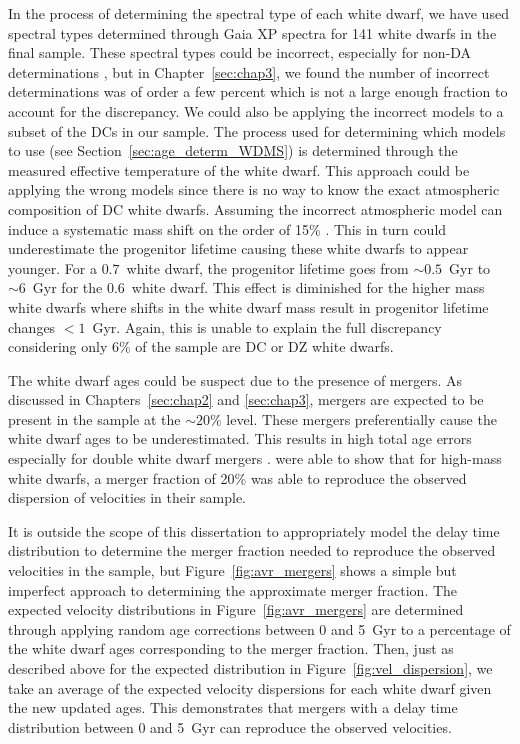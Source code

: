 In the process of determining the spectral type of each white dwarf, we have used spectral types determined through Gaia XP spectra for 141 white dwarfs in the final sample. These spectral types could be incorrect, especially for non-DA determinations \citep{2024ANA...682A...5V}, but in Chapter~\ref{sec:chap3}, we found the number of incorrect determinations was of order a few percent which is not a large enough fraction to account for the discrepancy. We could also be applying the incorrect models to a subset of the DCs in our sample. The process used for determining which models to use (see Section~\ref{sec:age_determ_WDMS}) is determined through the measured effective temperature of the white dwarf. This approach could be applying the wrong models since there is no way to know the exact atmospheric composition of DC white dwarfs. Assuming the incorrect atmospheric model can induce a systematic mass shift on the order of 15\% \citep{2012ApJS..199...29G}. This in turn could underestimate the progenitor lifetime causing these white dwarfs to appear younger. For a $0.7$\msun\ white dwarf, the progenitor lifetime goes from $\sim0.5$~Gyr to $\sim6$~Gyr for the $0.6$\msun\ white dwarf. This effect is diminished for the higher mass white dwarfs where shifts in the white dwarf mass result in progenitor lifetime changes $<1$~Gyr. Again, this is unable to explain the full discrepancy considering only 6\% of the sample are DC or DZ white dwarfs.

The white dwarf ages could be suspect due to the presence of mergers. As discussed in Chapters~\ref{sec:chap2} and \ref{sec:chap3}, mergers are expected to be present in the sample at the $\sim20\%$ level. These mergers preferentially cause the white dwarf ages to be underestimated. This results in high total age errors especially for double white dwarf mergers \citep[e.g.,][]{2014MNRAS.441..354T, 2020A&A...636A..31T}. \cite{2020ApJ...891..160C} were able to show that for high-mass white dwarfs, a merger fraction of 20\% was able to reproduce the observed dispersion of velocities in their sample. 

It is outside the scope of this dissertation to appropriately model the delay time distribution to determine the merger fraction needed to reproduce the observed velocities in the sample, but Figure~\ref{fig:avr_mergers} shows a simple but imperfect approach to determining the approximate merger fraction. The expected velocity distributions in Figure~\ref{fig:avr_mergers} are determined through applying random age corrections between 0 and 5~Gyr to a percentage of the white dwarf ages corresponding to the merger fraction. Then, just as described above for the expected distribution in Figure~\ref{fig:vel_dispersion}, we take an average of the expected velocity dispersions for each white dwarf given the new updated ages. This demonstrates that mergers with a delay time distribution between 0 and 5~Gyr can reproduce the observed velocities.

